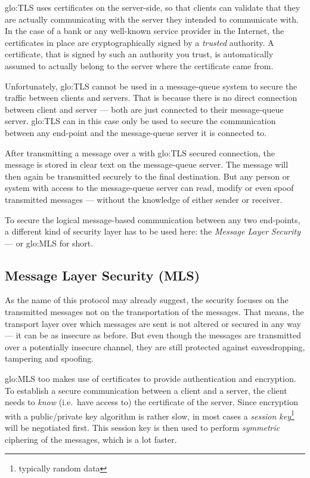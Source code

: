 \gls{glo:TLS} uses  certificates on the  server-side, so that  clients can
validate  that  they  are  actually  communicating with  the  server  they
intended to  communicate with.  In  the case of  a bank or  any well-known
service  provider   in  the  Internet,  the  certificates   in  place  are
cryptographically  signed by a  \emph{trusted} authority.   A certificate,
that is signed by such an authority you trust, is automatically assumed to
actually belong to the server where the certificate came from.

\bigskip

Unfortunately, \gls{glo:TLS}  cannot be used in a  message-queue system to
secure the traffic  between clients and servers. That  is because there is
no direct connection between client and server --- both are just connected
to their message-queue server. \gls{glo:TLS} can in this case only be used
to secure  the communication between  any end-point and  the message-queue
server it  is connected to.

After transmitting a message over a with \gls{glo:TLS} secured connection,
the  message is  stored in  clear text  on the  message-queue  server. The
message   will  then   again  be   transmitted  securely   to   the  final
destination. But  any person  or system with  access to  the message-queue
server can read, modify or even spoof transmitted messages --- without the
knowledge of either sender or receiver.

To  secure  the  logical   message-based  communication  between  any  two
end-points, a  different kind of security  layer has to be  used here: the
\emph{Message Layer Security} --- or \gls{glo:MLS} for short.

\subsection[Message Layer Security]{Message Layer Security (MLS)}

As the name of this protocol  may already suggest, the security focuses on
the transmitted messages not on  the transportation of the messages.  That
means, the transport layer over which  messages are sent is not altered or
secured in any way  --- it can be as insecure as  before.  But even though
the messages are transmitted over a potentially insecure channel, they are
still protected against eavesdropping, tampering and spoofing.

\gls{glo:MLS} too makes use  of certificates to provide authentication and
encryption. To  establish a  secure communication between  a client  and a
server,  the  client  needs  to  \emph{know}  (i.e.~have  access  to)  the
certificate  of the server.   Since encryption  with a  public/private key
algorithm   is    rather   slow,    in   most   cases    a   \emph{session
  key}\footnote{typically  random data}  will be  negotiated  first.  This
session  key is  then used  to perform  \emph{symmetric} ciphering  of the
messages, which is a lot faster.

